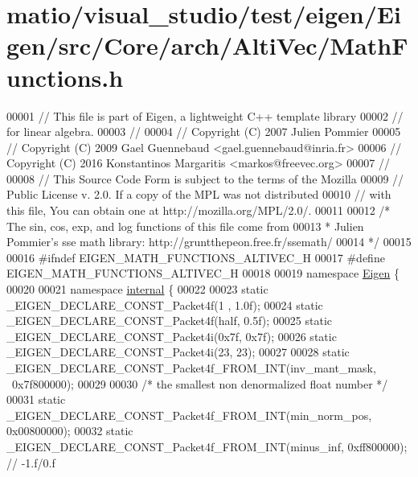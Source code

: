 \hypertarget{matio_2visual__studio_2test_2eigen_2_eigen_2src_2_core_2arch_2_alti_vec_2_math_functions_8h_source}{}\section{matio/visual\+\_\+studio/test/eigen/\+Eigen/src/\+Core/arch/\+Alti\+Vec/\+Math\+Functions.h}
\label{matio_2visual__studio_2test_2eigen_2_eigen_2src_2_core_2arch_2_alti_vec_2_math_functions_8h_source}

\begin{DoxyCode}
00001 \textcolor{comment}{// This file is part of Eigen, a lightweight C++ template library}
00002 \textcolor{comment}{// for linear algebra.}
00003 \textcolor{comment}{//}
00004 \textcolor{comment}{// Copyright (C) 2007 Julien Pommier}
00005 \textcolor{comment}{// Copyright (C) 2009 Gael Guennebaud <gael.guennebaud@inria.fr>}
00006 \textcolor{comment}{// Copyright (C) 2016 Konstantinos Margaritis <markos@freevec.org>}
00007 \textcolor{comment}{//}
00008 \textcolor{comment}{// This Source Code Form is subject to the terms of the Mozilla}
00009 \textcolor{comment}{// Public License v. 2.0. If a copy of the MPL was not distributed}
00010 \textcolor{comment}{// with this file, You can obtain one at http://mozilla.org/MPL/2.0/.}
00011 
00012 \textcolor{comment}{/* The sin, cos, exp, and log functions of this file come from}
00013 \textcolor{comment}{ * Julien Pommier's sse math library: http://gruntthepeon.free.fr/ssemath/}
00014 \textcolor{comment}{ */}
00015 
00016 \textcolor{preprocessor}{#ifndef EIGEN\_MATH\_FUNCTIONS\_ALTIVEC\_H}
00017 \textcolor{preprocessor}{#define EIGEN\_MATH\_FUNCTIONS\_ALTIVEC\_H}
00018 
00019 \textcolor{keyword}{namespace }\hyperlink{namespace_eigen}{Eigen} \{
00020 
00021 \textcolor{keyword}{namespace }\hyperlink{namespaceinternal}{internal} \{
00022 
00023 \textcolor{keyword}{static} \_EIGEN\_DECLARE\_CONST\_Packet4f(1 , 1.0f);
00024 \textcolor{keyword}{static} \_EIGEN\_DECLARE\_CONST\_Packet4f(half, 0.5f);
00025 \textcolor{keyword}{static} \_EIGEN\_DECLARE\_CONST\_Packet4i(0x7f, 0x7f);
00026 \textcolor{keyword}{static} \_EIGEN\_DECLARE\_CONST\_Packet4i(23, 23);
00027 
00028 \textcolor{keyword}{static} \_EIGEN\_DECLARE\_CONST\_Packet4f\_FROM\_INT(inv\_mant\_mask, ~0x7f800000);
00029 
00030 \textcolor{comment}{/* the smallest non denormalized float number */}
00031 \textcolor{keyword}{static} \_EIGEN\_DECLARE\_CONST\_Packet4f\_FROM\_INT(min\_norm\_pos,  0x00800000);
00032 \textcolor{keyword}{static} \_EIGEN\_DECLARE\_CONST\_Packet4f\_FROM\_INT(minus\_inf,     0xff800000); \textcolor{comment}{// -1.f/0.f}

\end{DoxyCode}
